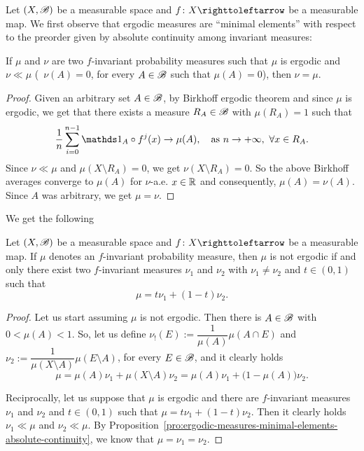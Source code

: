Let $(X,\mathscr{B})$ be a measurable space and $f\colon X\carr$ be a measurable map. We first observe that ergodic measures are ``minimal elements'' with respect to the preorder given by absolute continuity among invariant measures:

\begin{proposition}\label{pro:ergodic-measures-minimal-elements-absolute-continuity}
  If $\mu$ and $\nu$ are two $f$-invariant probability measures such that $\mu$ is ergodic and $\nu\ll\mu$ (\ie~$\nu(A)=0$, for every $A\in\mathscr{B}$ such that $\mu(A)=0$), then $\nu=\mu$.
\end{proposition}

\begin{proof}
  Given an arbitrary set $A\in\mathscr{B}$, by Birkhoff ergodic theorem and since $\mu$ is ergodic, we get that there exists a measure $R_{A}\in\mathscr{B}$ with $\mu(R_{A})=1$ such that
  \begin{displaymath}
    \frac{1}{n}\sum_{i=0}^{n-1}\ds{1}_{A}\circ f^{j}(x) \to \mu(A), \quad\text{as }n\to+\infty,\ \forall x\in R_{A}.
  \end{displaymath}
  Since $\nu\ll\mu$ and $\mu(X\setminus R_{A})=0$, we get $\nu(X\setminus R_{A})=0$. So the above Birkhoff averages converge to $\mu(A)$ for $\nu$-a.e. $x\in\mathbb{R}$ and consequently, $\mu(A)=\nu(A)$. Since $A$ was arbitrary, we get $\mu=\nu$.
\end{proof}

We get the following
\begin{corollary}\label{cor:ergodic-measures-as-extreme-points}
  Let $(X,\mathscr{B})$ be a measurable space and $f\colon X\carr$ be a measurable map. If $\mu$ denotes an $f$-invariant probability measure, then $\mu$ is not ergodic if and only there exist two $f$-invariant measures $\nu_{1}$ and $\nu_{2}$ with $\nu_{1}\neq\nu_{2}$ and $t\in (0,1)$ such that
  \begin{displaymath}
    \mu = t\nu_{1} + (1-t)\nu_{2}.
  \end{displaymath}
\end{corollary}

\begin{proof}
  Let us start assuming $\mu$ is not ergodic. Then there is $A\in\mathscr{B}$ with $0<\mu(A)<1$. So, let us define $\nu_{!}(E):=\dfrac{1}{\mu(A)}\mu(A\cap E)$ and $\nu_{2}:=\dfrac{1}{\mu(X\setminus A)}\mu(E\setminus A)$, for every $E\in\mathscr{B}$, and it clearly holds
  \begin{displaymath}
    \mu = \mu(A)\nu_{1} + \mu(X\setminus A)\nu_{2} = \mu(A)\nu_{1}+\big(1-\mu(A)\big)\nu_{2}.
  \end{displaymath}

  Reciprocally, let us suppose that $\mu$ is ergodic and there are $f$-invariant measures $\nu_{1}$ and $\nu_{2}$ and $t\in(0,1)$ such that $\mu=t\nu_{1}+(1-t)\nu_{2}$. Then it clearly holds $\nu_{1}\ll\mu$ and $\nu_{2}\ll\mu$. By Proposition~\ref{pro:ergodic-measures-minimal-elements-absolute-continuity}, we know that $\mu=\nu_{1}=\nu_{2}$.
\end{proof}


